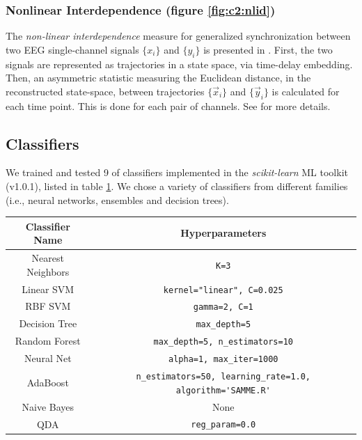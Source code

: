 \subsubsection{Nonlinear Interdependence (figure \ref{fig:c2:nlid})}
The \emph{non-linear interdependence} measure for generalized  synchronization between two EEG single-channel signals $\{x_i\}$ and $\{y_i\}$ is presented in \cite{mormann2007seizure}.
First, the two signals are represented as trajectories in a state space, via time-delay embedding. Then, an asymmetric statistic measuring the Euclidean distance, in the reconstructed state-space, between trajectories  $\{\vec{x}_i\}$ and $\{\vec{y}_i\}$ is calculated for each time point. This is done for each pair of channels. See \cite{mirowski2008comparing} for more details.

\subsection{Classifiers}
We trained and tested 9 of classifiers implemented in the \emph{scikit-learn} \cite{sklearn_api} ML toolkit (v1.0.1), listed in table \ref{table:classifiers}. We chose a variety of classifiers from different families (i.e., neural networks, ensembles and decision trees).

\begin{table}[h]
\centering
\renewcommand{\arraystretch}{1.3}

{}
\label{table:classifiers}

\begin{tabular}{|c|c|}
\hline
\textbf{Classifier Name} & \textbf{Hyperparameters}\\
\hline
Nearest Neighbors & \texttt{K=3} \\
\hline
Linear SVM & \texttt{kernel="linear", C=0.025}\\
\hline
RBF SVM & \texttt{gamma=2, C=1}\\
\hline
Decision Tree & \verb|max_depth=5|\\
\hline
Random Forest & \verb|max_depth=5, n_estimators=10|\\
\hline
Neural Net & \verb|alpha=1, max_iter=1000|\\
\hline
AdaBoost & \verb|n_estimators=50, learning_rate=1.0, algorithm='SAMME.R'|\\
\hline
Naive Bayes & None\\
\hline
QDA & \verb|reg_param=0.0|\\
\hline
\end{tabular}
\end{table}



